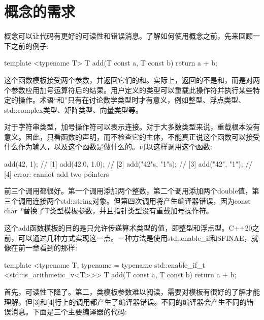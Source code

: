 \section{概念的需求}
概念可以让代码有更好的可读性和错误消息。了解如何使用概念之前，先来回顾一下之前的例子:

\begin{cpp}
template <typename T>
T add(T const a, T const b)
{
	return a + b;
}
\end{cpp}

这个函数模板接受两个参数，并返回它们的和。实际上，返回的不是和，而是对两个参数应用加号运算符后的结果。用户定义的类型可以重载此操作符并执行某些特定的操作。术语“和”只有在讨论数学类型时才有意义，例如整型、浮点类型、std::complex类型、矩阵类型、向量类型等。

对于字符串类型，加号操作符可以表示连接。对于大多数类型来说，重载根本没有意义。因此，只看函数的声明，而不检查它的主体，不能真正说这个函数可以接受什么作为输入，以及这个函数是做什么的。可以这样调用这个函数:

\begin{cpp}
add(42, 1); // [1]
add(42.0, 1.0); // [2]
add("42"s, "1"s); // [3]
add("42", "1"); // [4] error: cannot add two pointers
\end{cpp}

前三个调用都很好。第一个调用添加两个整数，第二个调用添加两个double值，第三个调用连接两个std::string对象。但第四次调用将产生编译器错误，因为const char *替换了T类型模板参数，并且指针类型没有重载加号操作符。

这个add函数模板的目的是只允许传递算术类型的值，即整型和浮点型。C++20之前，可以通过几种方式实现这一点。一种方法是使用std::enable\_if和SFINAE，就像在前一章看到的那样:

\begin{cpp}
template <typename T,
	typename = typename std::enable_if_t
		<std::is_arithmetic_v<T>>>
T add(T const a, T const b)
{
	return a + b;
}
\end{cpp}

首先，可读性下降了。第二，类模板参数难以阅读，需要对模板有很好的了解才能理解，但[3]和[4]行上的调用都产生了编译器错误。不同的编译器会产生不同的错误消息。下面是三个主要编译器的代码:

